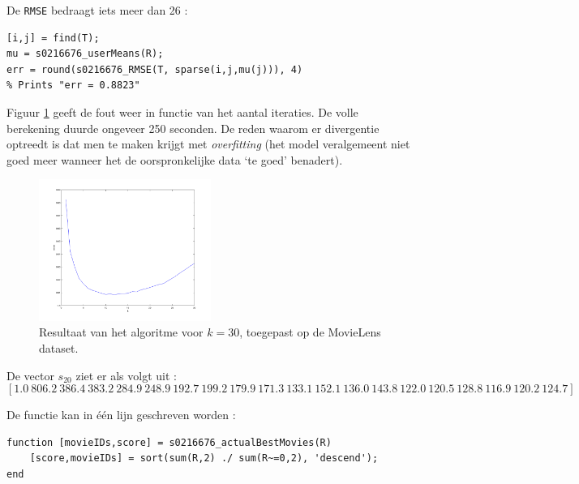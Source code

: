 De \texttt{RMSE} bedraagt iets meer dan 26 :

\begin{lstlisting}
[i,j] = find(T);
mu = s0216676_userMeans(R);
err = round(s0216676_RMSE(T, sparse(i,j,mu(j))), 4)
% Prints "err = 0.8823"
\end{lstlisting}



Figuur \ref{fig:op12} geeft de fout weer in functie van het aantal iteraties. De volle berekening duurde ongeveer 250 seconden. De reden waarom er divergentie optreedt is dat men te maken krijgt met \textit{overfitting} (het model veralgemeent niet goed meer wanneer het de oorspronkelijke data `te goed' benadert).

\begin{figure}[H]
\centering
\includegraphics[width=0.5\textwidth]{res/op12.png}
\caption{Resultaat van het algoritme voor $k=30$, toegepast op de MovieLens dataset.}
\label{fig:op12}
\end{figure}



De vector $s_{20}$ ziet er als volgt uit :
$$[1.0\ 806.2\ 386.4\ 383.2\ 284.9\ 248.9\ 192.7\ 199.2\ 179.9\ 171.3\ 133.1\ 152.1\ 136.0\ 143.8\ 122.0\ 120.5\ 128.8\ 116.9\ 120.2\ 124.7]$$



De functie kan in \'e\'en lijn geschreven worden :

\begin{lstlisting}
function [movieIDs,score] = s0216676_actualBestMovies(R)
    [score,movieIDs] = sort(sum(R,2) ./ sum(R~=0,2), 'descend');
end
\end{lstlisting}


